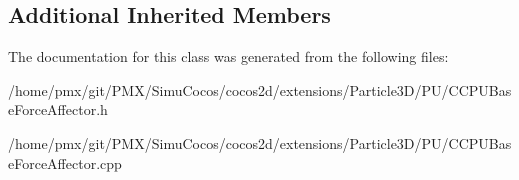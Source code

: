 \subsection*{Additional Inherited Members}


The documentation for this class was generated from the following files\+:\begin{DoxyCompactItemize}
\item 
/home/pmx/git/\+P\+M\+X/\+Simu\+Cocos/cocos2d/extensions/\+Particle3\+D/\+P\+U/C\+C\+P\+U\+Base\+Force\+Affector.\+h\item 
/home/pmx/git/\+P\+M\+X/\+Simu\+Cocos/cocos2d/extensions/\+Particle3\+D/\+P\+U/C\+C\+P\+U\+Base\+Force\+Affector.\+cpp\end{DoxyCompactItemize}
